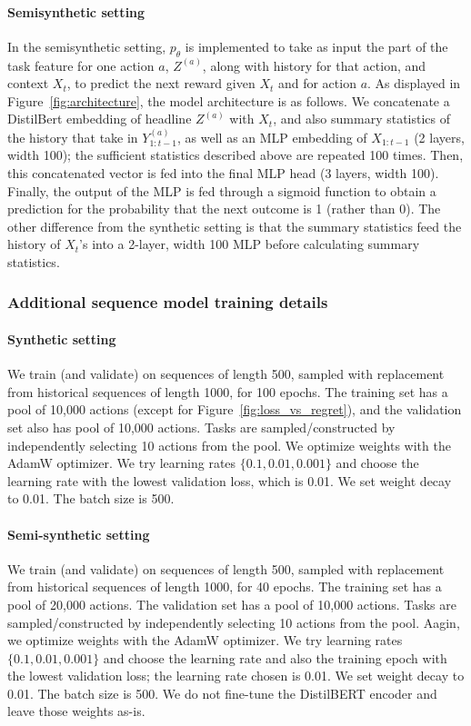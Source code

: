 \paragraph{Semisynthetic setting} In the semisynthetic setting, $p_\theta$ is implemented to take as input the part of the task feature for one action $a$, $Z^{(a)}$, along with history for that action, and context $X_t$, to predict the next reward given $X_t$ and for action $a$. As displayed in Figure~\ref{fig:architecture}, 
the model architecture is as follows. We concatenate a DistilBert \citep{sanh2019distilbert} embedding of headline $Z^{(a)}$ with $X_t$, and also summary statistics of the history that take in $Y_{1:t-1}^{(a)}$, as well as an MLP embedding of $X_{1:t-1}$ (2 layers, width 100); the sufficient statistics described above are  repeated 100 times. Then, this concatenated vector is fed into the final MLP head (3 layers, width 100). Finally, the output of the MLP is fed through a sigmoid function to obtain a prediction for the probability that the next outcome is 1 (rather than 0). 
The other difference from the synthetic setting is that the summary statistics feed the history of $X_t$'s into a 2-layer, width 100 MLP before calculating summary statistics. 




\subsubsection{Additional sequence model training details}
\label{app:poolactions}
\paragraph{Synthetic setting} We train (and validate) on sequences of length 500, sampled with replacement from historical sequences of length 1000, for 100 epochs. The training set has a pool of 10,000 actions (except for Figure~\ref{fig:loss_vs_regret}), and the validation set also has pool of 10,000 actions. Tasks are sampled/constructed by independently selecting 10 actions from the pool. We optimize weights with the AdamW optimizer. We try learning rates $\{0.1,0.01,0.001\}$ and choose the learning rate with the lowest validation loss, which is 0.01. We set weight decay to 0.01. The batch size is 500. 

\paragraph{Semi-synthetic setting} We train (and validate) on sequences of length 500, sampled with replacement from historical sequences of length 1000, for 40 epochs. 
The training set has a pool of 20,000 actions. The validation set has a pool of 10,000 actions. Tasks are sampled/constructed by independently selecting 10 actions from the pool. Aagin, we optimize weights with the AdamW optimizer. We try learning rates $\{0.1,0.01,0.001\}$ and choose the learning rate and also the training epoch with the lowest validation loss; the learning rate chosen is 0.01. We set weight decay to 0.01. The batch size is 500. We do not fine-tune the DistilBERT encoder and leave those weights as-is. 

